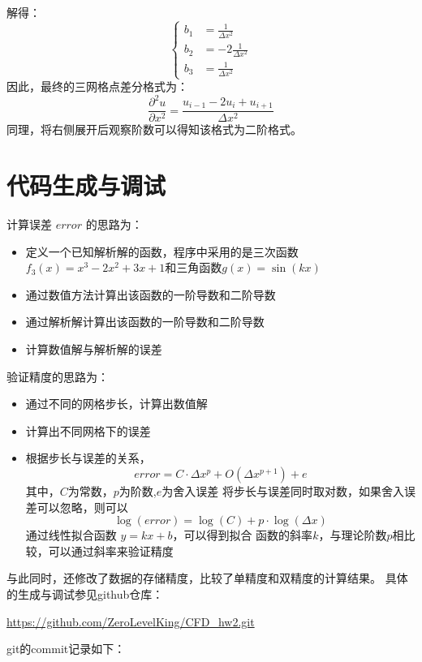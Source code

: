 \documentclass[UTF8]{ctexart}
\begin{document}
解得：
\begin{equation}
    \begin{cases}
        b_1 &=  \frac{1}{\Delta x^2}\\
        b_2 &=  -2\frac{1}{\Delta x^2}\\
        b_3 &=  \frac{1}{\Delta x^2}
    \end{cases}
\end{equation}
因此，最终的三网格点差分格式为：
\begin{equation}
    \frac{\partial^2 u}{\partial x^2} = \frac{u_{i-1} - 2u_i + u_{i+1}}{\Delta x^2}
\end{equation}
同理，将右侧展开后观察阶数可以得知该格式为二阶格式。


\section{代码生成与调试}
计算误差 $error$ 的思路为：
\begin{itemize}
    \item 定义一个已知解析解的函数，程序中采用的是三次函数$f_3(x) = x^3 - 2x^2 + 3x + 1$和三角函数$g(x) = \sin(kx)$
    \item 通过数值方法计算出该函数的一阶导数和二阶导数
    \item 通过解析解计算出该函数的一阶导数和二阶导数
    \item 计算数值解与解析解的误差
\end{itemize}
验证精度的思路为：
\begin{itemize}
    \item 通过不同的网格步长，计算出数值解
    \item 计算出不同网格下的误差
    \item 根据步长与误差的关系，
    \begin{equation}
        error = C \cdot \Delta x^p + O(\Delta x^{p+1}) + e
    \end{equation}
    其中，$C$为常数，$p$为阶数,$e$为舍入误差
    将步长与误差同时取对数，如果舍入误差可以忽略，则可以
    \begin{equation}
        \log(error) = \log(C) + p \cdot \log(\Delta x)
    \end{equation}
    通过线性拟合函数 $y = kx + b$，可以得到拟合
    函数的斜率$k$，与理论阶数$p$相比较，可以通过斜率来验证精度
\end{itemize}
与此同时，还修改了数据的存储精度，比较了单精度和双精度的计算结果。
具体的生成与调试参见github仓库：
\begin{center}
    \url{https://github.com/ZeroLevelKing/CFD_hw2.git}
\end{center}
git的commit记录如下：
\end{document}
